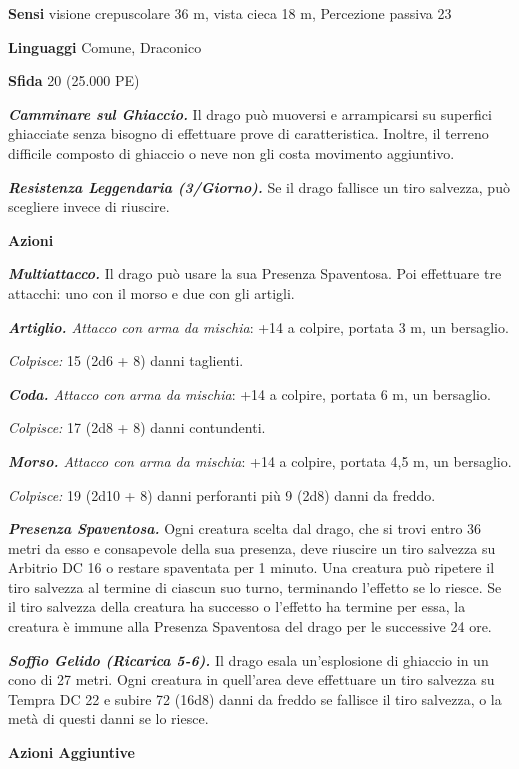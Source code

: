 \begin{multicols}{2}
\textbf{Sensi} visione crepuscolare 36 m, vista cieca 18 m, Percezione passiva
23

\textbf{Linguaggi} Comune, Draconico

\textbf{Sfida} 20 (25.000 PE)\smallskip

\emph{\textbf{Camminare sul Ghiaccio.}} Il drago può muoversi e
arrampicarsi su superfici ghiacciate senza bisogno di effettuare prove
di caratteristica. Inoltre, il terreno difficile composto di ghiaccio o
neve non gli costa movimento aggiuntivo.

\emph{\textbf{Resistenza Leggendaria (3/Giorno).}} Se il drago fallisce
un tiro salvezza, può scegliere invece di riuscire.

\smallskip\textbf{Azioni}

\emph{\textbf{Multiattacco.}} Il drago può usare la sua Presenza
Spaventosa. Poi effettuare tre attacchi: uno con il morso e due con gli
artigli.

\emph{\textbf{Artiglio.} Attacco con arma da mischia}: +14 a colpire,
portata 3 m, un bersaglio.

\emph{Colpisce:} 15 (2d6 + 8) danni taglienti.

\emph{\textbf{Coda.} Attacco con arma da mischia}: +14 a colpire,
portata 6 m, un bersaglio.

\emph{Colpisce:} 17 (2d8 + 8) danni contundenti.

\emph{\textbf{Morso.} Attacco con arma da mischia}: +14 a colpire,
portata 4,5 m, un bersaglio.

\emph{Colpisce:} 19 (2d10 + 8) danni perforanti più 9 (2d8) danni da
freddo.

\emph{\textbf{Presenza Spaventosa.}} Ogni creatura scelta dal drago, che
si trovi entro 36 metri da esso e consapevole della sua presenza, deve
riuscire un tiro salvezza su Arbitrio DC 16 o restare spaventata per 1
minuto. Una creatura può ripetere il tiro salvezza al termine di ciascun
suo turno, terminando l'effetto se lo riesce. Se il tiro salvezza della
creatura ha successo o l'effetto ha termine per essa, la creatura è
immune alla Presenza Spaventosa del drago per le successive 24 ore.

\emph{\textbf{Soffio Gelido (Ricarica 5-6).}} Il drago esala
un'esplosione di ghiaccio in un cono di 27 metri. Ogni creatura in
quell'area deve effettuare un tiro salvezza su Tempra DC 22 e
subire 72 (16d8) danni da freddo se fallisce il tiro salvezza, o la metà
di questi danni se lo riesce.

\textbf{Azioni Aggiuntive}


\end{multicols}
